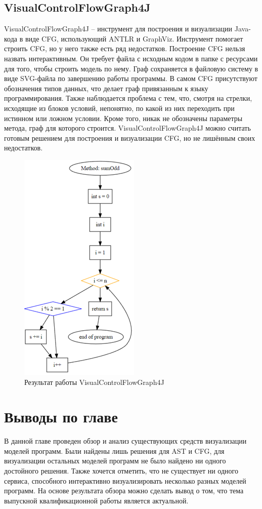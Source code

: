 \subsection{VisualControlFlowGraph4J} \label{ch2:subsec-title-abbr}
VisualControlFlowGraph4J – инструмент для построения и визуализации Java-кода в виде CFG, использующий ANTLR и GraphViz.
Инструмент помогает строить CFG, но у него также есть ряд недостатков. Построение CFG нельзя назвать интерактивным. Он требует файла с исходным кодом в папке с ресурсами для того, чтобы строить модель по нему. Граф сохраняется в файловую систему в виде SVG-файла по завершению работы программы. В самом CFG присутствуют обозначения типов данных, что делает граф привязанным к языку программирования. Также наблюдается проблема с тем, что, смотря на стрелки, исходящие из блоков условий, непонятно, по какой из них переходить при истинном или ложном условии. Кроме того, никак не обозначены параметры метода, граф для которого строится.
VisualControlFlowGraph4J можно считать готовым решением для построения и визуализации CFG, но не лишённым своих недостатков.
\begin{figure}[ht!] 
	\center
	\includegraphics [scale=0.27] {my_folder/images/my/11}
	\caption{Результат работы VisualControlFlowGraph4J} 
	\label{fig:11}  
\end{figure}
\section{Выводы по главе} \label{ch2:sec2}
В данной главе проведен обзор и анализ существующих средств визуализации моделей программ. Были найдены лишь решения для AST и CFG, для визуализации остальных моделей программ не было найдено ни одного достойного решения. Также хочется отметить, что не существует ни одного сервиса, способного интерактивно визуализировать несколько разных моделей программ. На основе результата обзора можно сделать вывод о том, что тема выпускной квалификационной работы является актуальной.
\newpage











